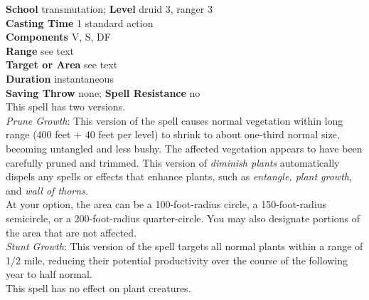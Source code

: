 \textbf{School} transmutation; \textbf{Level} druid 3, ranger 3\\
\textbf{Casting Time} 1 standard action\\
\textbf{Components} V, S, DF\\
\textbf{Range} see text\\
\textbf{Target or Area} see text\\
\textbf{Duration} instantaneous\\
\textbf{Saving Throw} none; \textbf{Spell Resistance} no\\
This spell has two versions.\\
\textit{Prune Growth}: This version of the spell causes normal vegetation within long range (400 feet + 40 feet per level) to shrink to about one-third normal size, becoming untangled and less bushy. The affected vegetation appears to have been carefully pruned and trimmed. This version of \textit{diminish plants} automatically dispels any spells or effects that enhance plants, such as \textit{entangle, plant growth, }and \textit{wall of thorns}.\\
At your option, the area can be a 100-foot-radius circle, a 150-foot-radius semicircle, or a 200-foot-radius quarter-circle. You may also designate portions of the area that are not affected.\\
\textit{Stunt Growth}: This version of the spell targets all normal plants within a range of 1/2 mile, reducing their potential productivity over the course of the following year to half normal. \\
This spell has no effect on plant creatures.\\
